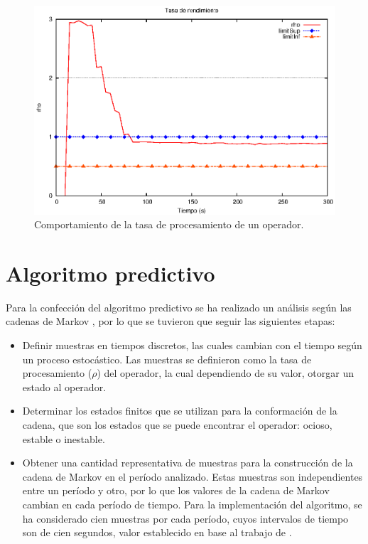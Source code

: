 \begin{figure}[ht!]
  \centering
    \includegraphics[scale=0.8]{images/Umbrales.eps}
  \caption{Comportamiento de la tasa de procesamiento de un operador.}
  \label{fig:umbrales}
\end{figure}


\section{Algoritmo predictivo}
Para la confección del algoritmo predictivo se ha realizado un análisis según las cadenas de Markov \citep{ching2006markov}, por lo que se tuvieron que seguir las siguientes etapas:

\begin{itemize}
	\item Definir muestras en tiempos discretos, las cuales cambian con el tiempo según un proceso estocástico. Las muestras se definieron como la tasa de procesamiento ($\rho$) del operador, la cual dependiendo de su valor, otorgar un estado al operador.
	\item Determinar los estados finitos que se utilizan para la conformación de la cadena, que son los estados que se puede encontrar el operador: ocioso, estable o inestable.
	\item Obtener una cantidad representativa de muestras para la construcción de la cadena de Markov en el período analizado. Estas muestras son independientes entre un período y otro, por lo que los valores de la cadena de Markov cambian en cada período de tiempo. Para la implementación del algoritmo, se ha considerado cien muestras por cada período, cuyos intervalos de tiempo son de cien segundos, valor establecido en base al trabajo de \citep{GongGW10}.
\end{itemize}

